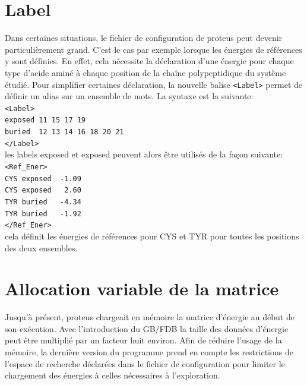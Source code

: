 \section{Label}
Dans certaines situations, le fichier de configuration de proteus peut devenir particulièrement grand. C'est le cas par exemple lorsque les énergies de références y sont définies. En effet, cela nécessite la déclaration d'une énergie pour chaque type d'acide aminé à chaque position de la chaîne polypeptidique du système étudié. Pour simplifier certaines déclaration, la nouvelle balise \verb!<Label>! permet de définir un alias sur un ensemble de mots. La syntaxe est la suivante:\\
\verb!<Label>! \\
\verb!exposed 11 15 17 19 ! \\
\verb!buried  12 13 14 16 18 20 21 ! \\
\verb!</Label>! \\
les labels \og exposed \fg et \og exposed \fg peuvent alors être utilisés de la façon suivante:\\
\verb!<Ref_Ener>! \\
\verb!CYS exposed  -1.09 ! \\
\verb!CYS exposed   2.60! \\
\verb!TYR buried   -4.34! \\
\verb!TYR buried   -1.92! \\
\verb!</Ref_Ener>! \\
cela définit les énergies de références pour CYS et TYR pour toutes les positions des deux ensembles.


\section{Allocation variable de la matrice}

Jusqu'à présent, proteus chargeait en mémoire la matrice d'énergie au début de son exécution. Avec l'introduction du GB/FDB la taille des données d'énergie peut être multiplié par un facteur huit environ. Afin de réduire l'usage de la mémoire, la dernière version du programme prend en compte les restrictions de l'espace de recherche déclarées dans le fichier de configuration pour limiter le chargement des énergies à celles nécessaires à l'exploration.  

\clearpage


